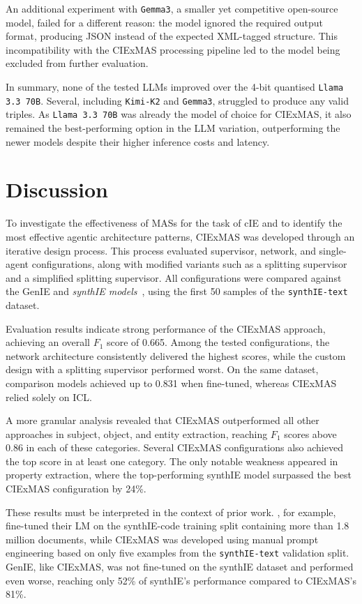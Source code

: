 \documentclass[a4paper,oneside,bibliography=totoc]{scrbook}
\begin{document}
An additional experiment with \texttt{Gemma3}, a smaller yet competitive open-source model, failed for a different reason: the model ignored the required output format, producing JSON instead of the expected XML-tagged structure. This incompatibility with the CIExMAS processing pipeline led to the model being excluded from further evaluation.

In summary, none of the tested \acp{LLM} improved over the 4-bit quantised \texttt{Llama 3.3 70B}. Several, including \texttt{Kimi-K2} and \texttt{Gemma3}, struggled to produce any valid triples. As \texttt{Llama 3.3 70B} was already the model of choice for CIExMAS, it also remained the best-performing option in the LLM variation, outperforming the newer models despite their higher inference costs and latency.

\section{Discussion}
\label{sec:discussion}

To investigate the effectiveness of \acp{MAS} for the task of \ac{cIE} and to identify the most effective agentic architecture patterns, CIExMAS was developed through an iterative design process. This process evaluated supervisor, network, and single-agent configurations, along with modified variants such as a splitting supervisor and a simplified splitting supervisor. All configurations were compared against the GenIE and \textit{synthIE models}~\cite{Josifoski2021,Josifoski2023}, using the first 50 samples of the \texttt{synthIE-text} dataset.

Evaluation results indicate strong performance of the CIExMAS approach, achieving an overall $F_{1}$ score of 0.665. Among the tested configurations, the network architecture consistently delivered the highest scores, while the custom design with a splitting supervisor performed worst. On the same dataset, comparison models achieved up to 0.831 when fine-tuned, whereas CIExMAS relied solely on \ac{ICL}.

A more granular analysis revealed that CIExMAS outperformed all other approaches in subject, object, and entity extraction, reaching $F_{1}$ scores above 0.86 in each of these categories. Several CIExMAS configurations also achieved the top score in at least one category. The only notable weakness appeared in property extraction, where the top-performing synthIE model surpassed the best CIExMAS configuration by 24\%.

These results must be interpreted in the context of prior work. \citet{Josifoski2023}, for example, fine-tuned their \ac{LM} on the synthIE-code training split containing more than 1.8 million documents, while CIExMAS was developed using manual prompt engineering based on only five examples from the \texttt{synthIE-text} validation split. GenIE, like CIExMAS, was not fine-tuned on the synthIE dataset and performed even worse, reaching only 52\% of synthIE’s performance compared to CIExMAS’s 81\%.
\end{document}
